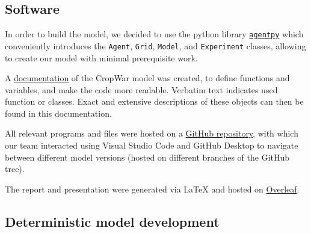 \documentclass[a4paper,12pt]{article} %
\begin{document}
\subsection{Software}
In order to build the model, we decided to use the python library \href{https://agentpy.readthedocs.io/en/stable/overview.html}{\texttt{agentpy}} which conveniently introduces the \texttt{Agent}, \texttt{Grid}, \texttt{Model}, and \texttt{Experiment} classes, allowing to create our model with minimal prerequisite work.

A \href{https://n.ethz.ch/~cgolling/gess/html/index.html}{documentation} of the CropWar model was created, to define functions and variables, and make the code more readable. Verbatim text indicates used function or classes. Exact and extensive descriptions of these objects can then be found in this documentation.

All relevant programs and files were hosted on a \href{https://github.com/Anon75014/AgentBasedModelling}{GitHub repository}, with which our team interacted using Visual Studio Code and GitHub Desktop to navigate between different model versions (hosted on different branches of the GitHub tree).

The report and presentation were generated via LaTeX and hosted on  \href{https://www.overleaf.com/project/6194c8fcca8840f65bb0ee02}{Overleaf}.






\newpage
\subsection{Deterministic model development}
\end{document}
